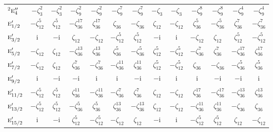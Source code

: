 \documentclass[10pt,a4paper]{article}
\makeatletter
\def\grouprule#1#2{\noalign{\marks\LTgroupmarks{\the\belowrulesep}\nobreak\vskip#1%
  \vskip\aboverulesep}\multispan\LT@cols\unskip{\leaders\hrule\@height#2\hfill\kern\z@}\cr
  \noalign{\penalty\LTrulebreak\vskip\belowrulesep\global\@lastruleclass\z@}}
\numberwithin{equation}{section}
\newcommand{\irr}[1]{\text{\normalfont\scshape #1}}
\newcommand{\conjpair}[1]{{}^{#1}}
\newcommand{\iunit}{\mathrm{i}}
\newcommand{\rootunity}[1]{\zeta_{#1}}
\makeatother
\begin{document}
{\begin{longtable}{@{}lcccccccccccc@{}}
$\conjpair{2}\irr{e}_{4}''$ & $-\rootunity{3}^{2}$ & $-\rootunity{3}^{2}$ & $-\rootunity{9}^{2}$ & $-\rootunity{9}^{2}$ & $-\rootunity{9}^{7}$ & $-\rootunity{9}^{7}$ & $-\rootunity{3}$ & $-\rootunity{3}$ & $-\rootunity{9}^{8}$ & $-\rootunity{9}^{8}$ & $-\rootunity{9}^{4}$ & $-\rootunity{9}^{4}$\\
\grouprule{0pt}{\lightrulewidth}
$\irr{e}_{1/2}'$ & $-\rootunity{12}^{5}$ & $\rootunity{12}^{5}$ & $-\rootunity{36}^{17}$ & $\rootunity{36}^{17}$ & $\rootunity{36}$ & $-\rootunity{36}$ & $\rootunity{12}$ & $-\rootunity{12}$ & $\rootunity{36}^{5}$ & $-\rootunity{36}^{5}$ & $\rootunity{36}^{7}$ & $-\rootunity{36}^{7}$\\
$\irr{e}_{3/2}'$ & $\iunit{}$ & $-\iunit{}$ & $\rootunity{12}$ & $-\rootunity{12}$ & $-\rootunity{12}^{5}$ & $\rootunity{12}^{5}$ & $-\iunit{}$ & $\iunit{}$ & $-\rootunity{12}$ & $\rootunity{12}$ & $\rootunity{12}^{5}$ & $-\rootunity{12}^{5}$\\
$\irr{e}_{5/2}'$ & $-\rootunity{12}$ & $\rootunity{12}$ & $-\rootunity{36}^{13}$ & $\rootunity{36}^{13}$ & $\rootunity{36}^{5}$ & $-\rootunity{36}^{5}$ & $\rootunity{12}^{5}$ & $-\rootunity{12}^{5}$ & $-\rootunity{36}^{7}$ & $\rootunity{36}^{7}$ & $-\rootunity{36}^{17}$ & $\rootunity{36}^{17}$\\
$\irr{e}_{7/2}'$ & $-\rootunity{12}$ & $\rootunity{12}$ & $\rootunity{36}^{7}$ & $-\rootunity{36}^{7}$ & $-\rootunity{36}^{11}$ & $\rootunity{36}^{11}$ & $\rootunity{12}^{5}$ & $-\rootunity{12}^{5}$ & $\rootunity{36}$ & $-\rootunity{36}$ & $-\rootunity{36}^{5}$ & $\rootunity{36}^{5}$\\
$\irr{e}_{9/2}'$ & $\iunit{}$ & $-\iunit{}$ & $-\iunit{}$ & $\iunit{}$ & $\iunit{}$ & $-\iunit{}$ & $-\iunit{}$ & $\iunit{}$ & $\iunit{}$ & $-\iunit{}$ & $-\iunit{}$ & $\iunit{}$\\
$\irr{e}_{11/2}'$ & $-\rootunity{12}^{5}$ & $\rootunity{12}^{5}$ & $\rootunity{36}^{11}$ & $-\rootunity{36}^{11}$ & $-\rootunity{36}^{7}$ & $\rootunity{36}^{7}$ & $\rootunity{12}$ & $-\rootunity{12}$ & $\rootunity{36}^{17}$ & $-\rootunity{36}^{17}$ & $-\rootunity{36}^{13}$ & $\rootunity{36}^{13}$\\
$\irr{e}_{13/2}'$ & $-\rootunity{12}^{5}$ & $\rootunity{12}^{5}$ & $-\rootunity{36}^{5}$ & $\rootunity{36}^{5}$ & $\rootunity{36}^{13}$ & $-\rootunity{36}^{13}$ & $\rootunity{12}$ & $-\rootunity{12}$ & $-\rootunity{36}^{11}$ & $\rootunity{36}^{11}$ & $-\rootunity{36}$ & $\rootunity{36}$\\
$\irr{e}_{15/2}'$ & $\iunit{}$ & $-\iunit{}$ & $\rootunity{12}^{5}$ & $-\rootunity{12}^{5}$ & $-\rootunity{12}$ & $\rootunity{12}$ & $-\iunit{}$ & $\iunit{}$ & $-\rootunity{12}^{5}$ & $\rootunity{12}^{5}$ & $\rootunity{12}$ & $-\rootunity{12}$\\

\end{longtable}}
\end{document}
